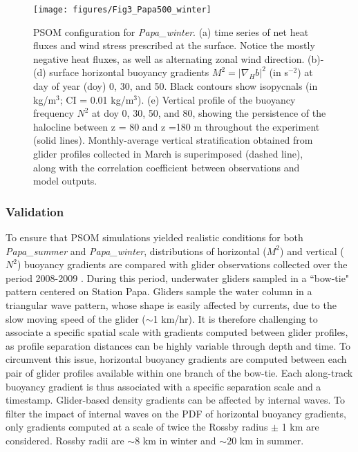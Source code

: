 \documentclass[draft,linenumbers]{agujournal2018}
\begin{document}
\begin{figure}[ht]
	\texttt{[image: figures/Fig3\_Papa500\_winter]}
	\caption{PSOM configuration for \textit{Papa\_winter}. (a) time series of net heat fluxes and wind stress prescribed at the surface. Notice the mostly negative heat fluxes, as well as alternating zonal wind direction. (b)-(d) surface horizontal buoyancy gradients $M^2 = |\nabla_Hb|^2$ (in s$^{-2}$) at day of year (doy) 0, 30, and 50. Black contours show isopycnals (in kg/m$^3$; CI = 0.01 kg/m$^3$). (e) Vertical profile of the buoyancy frequency $N^2$ at doy 0, 30, 50, and 80, showing the persistence of the halocline between z = 80 and z =180 m throughout the experiment (solid lines). Monthly-average vertical stratification obtained from glider profiles collected in March is superimposed (dashed line), along with the correlation coefficient between observations and model outputs.}
	\label{fig: Papa_winter}
\end{figure}


\subsubsection{Validation}
\label{sec: glider_validation}

To ensure that PSOM simulations yielded realistic conditions for both \textit{Papa\_summer} and \textit{Papa\_winter}, distributions of horizontal ($M^2$) and vertical ($N^2$) buoyancy gradients are compared with glider observations collected over the period 2008-2009 \citep{Pelland_2016}.
During this period, underwater gliders sampled in a ``bow-tie" pattern centered on Station Papa. Gliders sample the water column in a triangular wave pattern, whose shape is easily affected by currents, due to the slow moving speed of the glider ($\sim$1 km/hr). It is therefore challenging to associate a specific spatial scale with gradients computed between glider profiles, as profile separation distances can be highly variable through depth and time. To circumvent this issue, horizontal buoyancy gradients are computed between each pair of glider profiles available within one branch of the bow-tie. Each along-track buoyancy gradient is thus associated with a specific separation scale and a timestamp. Glider-based density gradients can be affected by internal waves. To filter the impact of internal waves on the PDF of horizontal buoyancy gradients, only gradients computed at a scale of twice the Rossby radius $\pm$ 1 km are considered. Rossby radii are $\sim 8$ km in winter and $\sim 20$ km in summer.
 
\end{document}
